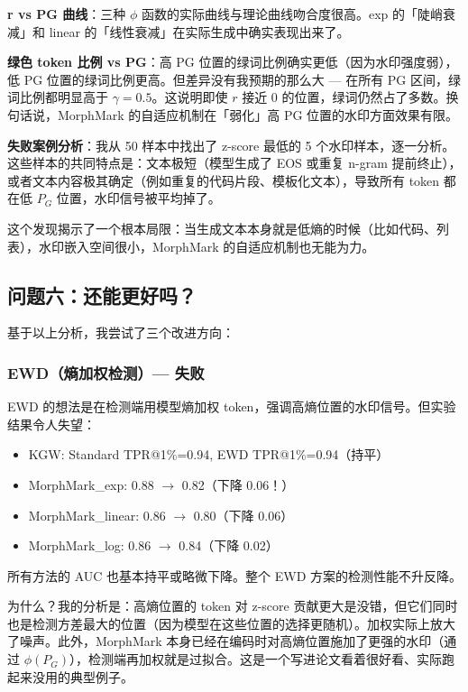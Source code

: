 \documentclass[11pt,a4paper]{article}
\begin{document}
\textbf{r vs PG 曲线}：三种 $\phi$ 函数的实际曲线与理论曲线吻合度很高。exp 的「陡峭衰减」和 linear 的「线性衰减」在实际生成中确实表现出来了。

\textbf{绿色 token 比例 vs PG}：高 PG 位置的绿词比例确实更低（因为水印强度弱），低 PG 位置的绿词比例更高。但差异没有我预期的那么大 — 在所有 PG 区间，绿词比例都明显高于 $\gamma=0.5$。这说明即使 $r$ 接近 0 的位置，绿词仍然占了多数。换句话说，MorphMark 的自适应机制在「弱化」高 PG 位置的水印方面效果有限。

\textbf{失败案例分析}：我从 50 样本中找出了 z-score 最低的 5 个水印样本，逐一分析。这些样本的共同特点是：文本极短（模型生成了 EOS 或重复 n-gram 提前终止），或者文本内容极其确定（例如重复的代码片段、模板化文本），导致所有 token 都在低 $P_G$ 位置，水印信号被平均掉了。

这个发现揭示了一个根本局限：当生成文本本身就是低熵的时候（比如代码、列表），水印嵌入空间很小，MorphMark 的自适应机制也无能为力。

\subsection{问题六：还能更好吗？}

基于以上分析，我尝试了三个改进方向：

\subsubsection*{EWD（熵加权检测）— 失败}

EWD 的想法是在检测端用模型熵加权 token，强调高熵位置的水印信号。但实验结果令人失望：

\begin{itemize}[nosep]
  \item KGW: Standard TPR@1\%=0.94, EWD TPR@1\%=0.94（持平）
  \item MorphMark\_exp: 0.88 $\rightarrow$ 0.82（下降 0.06！）
  \item MorphMark\_linear: 0.86 $\rightarrow$ 0.80（下降 0.06）
  \item MorphMark\_log: 0.86 $\rightarrow$ 0.84（下降 0.02）
\end{itemize}

所有方法的 AUC 也基本持平或略微下降。整个 EWD 方案的检测性能不升反降。

为什么？我的分析是：高熵位置的 token 对 z-score 贡献更大是没错，但它们同时也是检测方差最大的位置（因为模型在这些位置的选择更随机）。加权实际上放大了噪声。此外，MorphMark 本身已经在编码时对高熵位置施加了更强的水印（通过 $\phi(P_G)$），检测端再加权就是过拟合。这是一个写进论文看着很好看、实际跑起来没用的典型例子。
\end{document}
